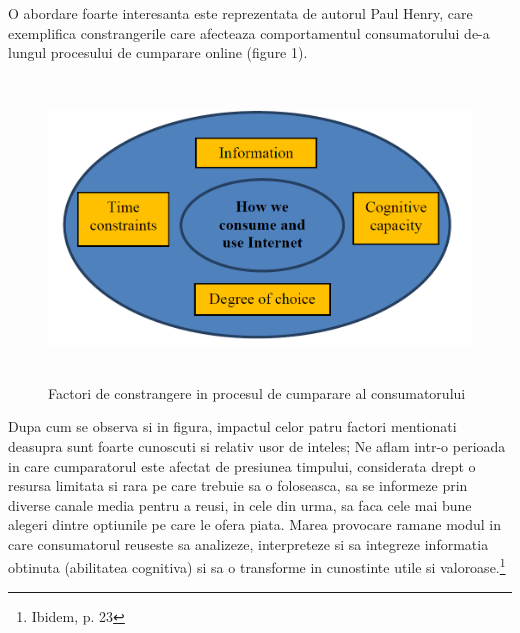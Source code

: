 \documentclass[a4paper, 12pt]{article}
\begin{document}
	\quad O abordare foarte interesanta este reprezentata de autorul Paul Henry, care exemplifica constrangerile care afecteaza comportamentul consumatorului de-a lungul procesului de cumparare online (figure 1).
	\begin{figure}[!htb]
		\centering
		\includegraphics[width=13cm, height=8cm]{"figures/first.png"}
		\caption{Factori de constrangere in procesul de cumparare al consumatorului}\label{fig:first}
	\end{figure}

	\quad Dupa cum se observa si in figura, impactul celor patru factori mentionati deasupra sunt foarte cunoscuti si relativ usor de inteles; Ne aflam intr-o perioada in care cumparatorul este afectat de presiunea timpului, considerata drept o resursa limitata si rara pe care trebuie sa o foloseasca, sa se informeze prin diverse canale media pentru a reusi, in cele din urma, sa faca cele mai bune alegeri dintre optiunile pe care le ofera piata. Marea provocare ramane modul in care consumatorul reuseste sa analizeze, interpreteze si sa integreze informatia obtinuta (abilitatea cognitiva) si sa o transforme in cunostinte utile si valoroase.\footnote{Ibidem, p. 23}
	
\end{document}
